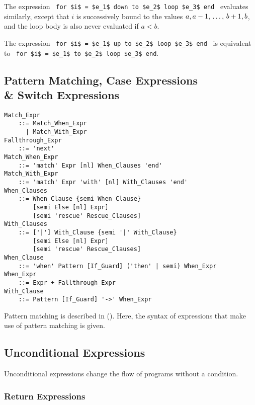 The expression ~\lstinline!for $i$ = $e_1$ down to $e_2$ loop $e_3$ end!~ evaluates similarly, except that $i$ is successively bound to the values $a, a-1 ,\, \ldots ,\, b+1, b$, and the loop body is also never evaluated if $a < b$. 

The expression ~\lstinline!for $i$ = $e_1$ up to $e_2$ loop $e_3$ end!~ is equivalent to ~\lstinline!for $i$ = $e_1$ to $e_2$ loop $e_3$ end!. 





\subsection[Pattern Matching, Case Expressions \& Switch Expressions]{Pattern Matching, Case Expressions \\\& Switch Expressions}
\label{sec:case-exprs}


\grammar\begin{lstlisting}
Match_Expr     
    ::= Match_When_Expr
      | Match_With_Expr
Fallthrough_Expr 
    ::= 'next'
Match_When_Expr
    ::= 'match' Expr [nl] When_Clauses 'end'
Match_With_Expr
    ::= 'match' Expr 'with' [nl] With_Clauses 'end'
When_Clauses
    ::= When_Clause {semi When_Clause} 
        [semi Else [nl] Expr]
        [semi 'rescue' Rescue_Clauses]
With_Clauses
    ::= ['|'] With_Clause {semi '|' With_Clause}
        [semi Else [nl] Expr]
        [semi 'rescue' Rescue_Clauses]
When_Clause 
    ::= 'when' Pattern [If_Guard] ('then' | semi) When_Expr
When_Expr
    ::= Expr + Fallthrough_Expr
With_Clause
    ::= Pattern [If_Guard] '->' When_Expr
\end{lstlisting}

Pattern matching is described in (). Here, the syntax of expressions that make use of pattern matching is given.





\subsection{Unconditional Expressions}

Unconditional expressions change the flow of programs without a condition. 






\subsubsection{Return Expressions}
\label{sec:return-expressions}

